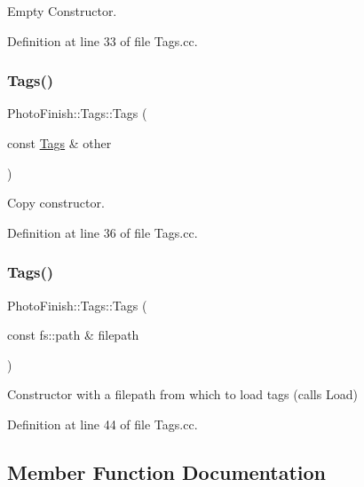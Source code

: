 Empty Constructor. 



Definition at line 33 of file Tags.\+cc.

\mbox{\label{class_photo_finish_1_1_tags_a9db994b3c40c2e4e1a92b0e7ca97ea18}} 
\subsubsection{\texorpdfstring{Tags()}{Tags()}\hspace{0.1cm}{\footnotesize\ttfamily [2/3]}}
{\footnotesize\ttfamily Photo\+Finish\+::\+Tags\+::\+Tags (\begin{DoxyParamCaption}\item[{const \hyperlink{class_photo_finish_1_1_tags}{Tags} \&}]{other }\end{DoxyParamCaption})}



Copy constructor. 



Definition at line 36 of file Tags.\+cc.

\mbox{\label{class_photo_finish_1_1_tags_ae65e11953c2edea6dd987f476ee50f76}} 
\subsubsection{\texorpdfstring{Tags()}{Tags()}\hspace{0.1cm}{\footnotesize\ttfamily [3/3]}}
{\footnotesize\ttfamily Photo\+Finish\+::\+Tags\+::\+Tags (\begin{DoxyParamCaption}\item[{const fs\+::path \&}]{filepath }\end{DoxyParamCaption})}



Constructor with a filepath from which to load tags (calls Load) 



Definition at line 44 of file Tags.\+cc.



\subsection{Member Function Documentation}
\mbox{\label{class_photo_finish_1_1_tags_aae062461270678541595404f0d277ef0}} 
